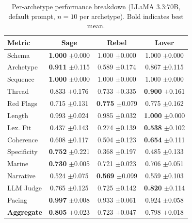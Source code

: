 \begin{table}[t]
\centering
\caption{Per-archetype performance breakdown (LLaMA 3.3:70B, default prompt, $n{=}10$ per archetype). Bold indicates best mean.}
\label{tab:archetype}
\begin{tabular}{lccc}
\toprule
Metric & Sage & Rebel & Lover \\
\midrule
Schema & \textbf{1.000} {\scriptsize$\pm$0.000} & 1.000 {\scriptsize$\pm$0.000} & 1.000 {\scriptsize$\pm$0.000} \\
Archetype & \textbf{0.911} {\scriptsize$\pm$0.115} & 0.589 {\scriptsize$\pm$0.174} & 0.867 {\scriptsize$\pm$0.115} \\
Sequence & \textbf{1.000} {\scriptsize$\pm$0.000} & 1.000 {\scriptsize$\pm$0.000} & 1.000 {\scriptsize$\pm$0.000} \\
Thread & 0.833 {\scriptsize$\pm$0.176} & 0.733 {\scriptsize$\pm$0.335} & \textbf{0.900} {\scriptsize$\pm$0.161} \\
Red Flags & 0.715 {\scriptsize$\pm$0.131} & \textbf{0.775} {\scriptsize$\pm$0.079} & 0.775 {\scriptsize$\pm$0.162} \\
Length & 0.993 {\scriptsize$\pm$0.024} & 0.985 {\scriptsize$\pm$0.032} & \textbf{1.000} {\scriptsize$\pm$0.000} \\
Lex. Fit & 0.437 {\scriptsize$\pm$0.143} & 0.274 {\scriptsize$\pm$0.139} & \textbf{0.538} {\scriptsize$\pm$0.102} \\
Coherence & 0.608 {\scriptsize$\pm$0.117} & 0.504 {\scriptsize$\pm$0.123} & \textbf{0.654} {\scriptsize$\pm$0.111} \\
Specificity & \textbf{0.752} {\scriptsize$\pm$0.221} & 0.368 {\scriptsize$\pm$0.197} & 0.485 {\scriptsize$\pm$0.133} \\
Marine & \textbf{0.730} {\scriptsize$\pm$0.005} & 0.721 {\scriptsize$\pm$0.023} & 0.706 {\scriptsize$\pm$0.051} \\
Narrative & 0.524 {\scriptsize$\pm$0.075} & \textbf{0.569} {\scriptsize$\pm$0.099} & 0.559 {\scriptsize$\pm$0.103} \\
LLM Judge & 0.765 {\scriptsize$\pm$0.125} & 0.725 {\scriptsize$\pm$0.142} & \textbf{0.820} {\scriptsize$\pm$0.114} \\
Pacing & \textbf{0.997} {\scriptsize$\pm$0.008} & 0.933 {\scriptsize$\pm$0.061} & 0.924 {\scriptsize$\pm$0.058} \\
\textbf{Aggregate} & \textbf{0.805} {\scriptsize$\pm$0.023} & 0.723 {\scriptsize$\pm$0.047} & 0.798 {\scriptsize$\pm$0.018} \\
\bottomrule
\end{tabular}
\end{table}